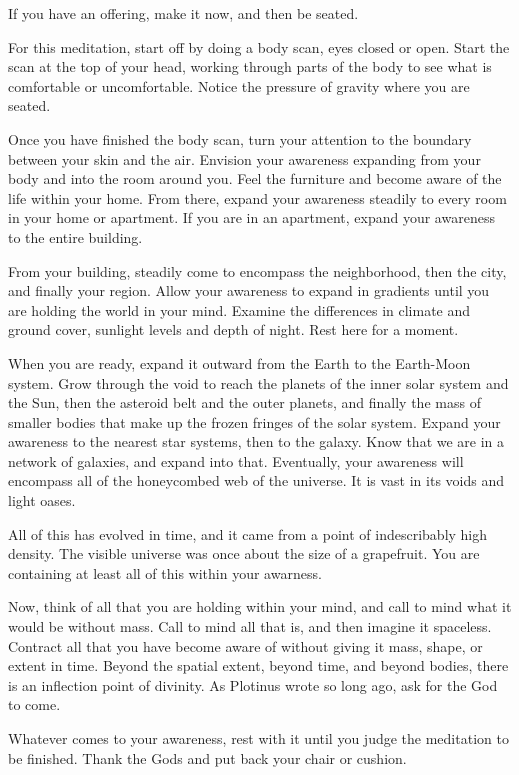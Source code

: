 \documentclass[
]{book}
\begin{document}
If you have an offering, make it now, and then be seated.

For this meditation, start off by doing a body scan, eyes closed or open. Start the scan at the top of your head, working through parts of the body to see what is comfortable or uncomfortable. Notice the pressure of gravity where you are seated.

Once you have finished the body scan, turn your attention to the boundary between your skin and the air. Envision your awareness expanding from your body and into the room around you. Feel the furniture and become aware of the life within your home. From there, expand your awareness steadily to every room in your home or apartment. If you are in an apartment, expand your awareness to the entire building.

From your building, steadily come to encompass the neighborhood, then the city, and finally your region. Allow your awareness to expand in gradients until you are holding the world in your mind. Examine the differences in climate and ground cover, sunlight levels and depth of night. Rest here for a moment.

When you are ready, expand it outward from the Earth to the Earth-Moon system. Grow through the void to reach the planets of the inner solar system and the Sun, then the asteroid belt and the outer planets, and finally the mass of smaller bodies that make up the frozen fringes of the solar system. Expand your awareness to the nearest star systems, then to the galaxy. Know that we are in a network of galaxies, and expand into that. Eventually, your awareness will encompass all of the honeycombed web of the universe. It is vast in its voids and light oases.

All of this has evolved in time, and it came from a point of indescribably high density. The visible universe was once about the size of a grapefruit. You are containing at least all of this within your awarness.

Now, think of all that you are holding within your mind, and call to mind what it would be without mass. Call to mind all that is, and then imagine it spaceless. Contract all that you have become aware of without giving it mass, shape, or extent in time. Beyond the spatial extent, beyond time, and beyond bodies, there is an inflection point of divinity. As Plotinus wrote so long ago, ask for the God to come.

Whatever comes to your awareness, rest with it until you judge the meditation to be finished. Thank the Gods and put back your chair or cushion.
\end{document}
